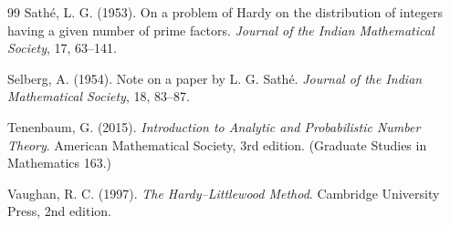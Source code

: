 \documentclass[]{interact}%
\begin{document}
\begin{thebibliography}{99}
Sath\'e, L. G. (1953).
\newblock On a problem of Hardy on the distribution of integers having a given number of prime factors.
\newblock \emph{Journal of the Indian Mathematical Society}, 17, 63--141.

Selberg, A. (1954).
\newblock Note on a paper by L. G. Sath\'e.
\newblock \emph{Journal of the Indian Mathematical Society}, 18, 83--87.

Tenenbaum, G. (2015).
\newblock \emph{Introduction to Analytic and Probabilistic Number Theory}.
\newblock American Mathematical Society, 3rd edition. (Graduate Studies in Mathematics 163.)

Vaughan, R. C. (1997).
\newblock \emph{The Hardy--Littlewood Method}.
\newblock Cambridge University Press, 2nd edition.

\end{thebibliography}
\end{document}
